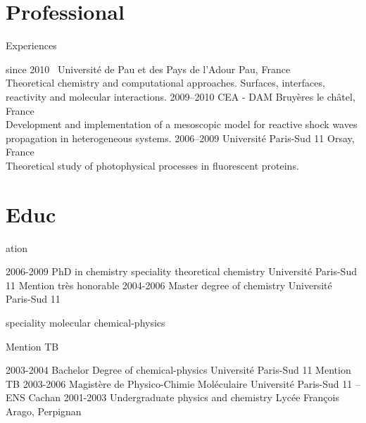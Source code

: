 \documentclass{cv-style}     %
\begin{document}

\section{Professional }{Experiences}
\vspace{-0.2cm}

\begin{entrylist}
\entry
  {since 2010~}
  {Université de Pau et des Pays de l'Adour}
  {Pau, France}
  {\\
   Theoretical chemistry and computational approaches.
   Surfaces, interfaces, reactivity and molecular interactions.}
\entry
  {2009--2010}
  {CEA - DAM}
  {Bruyères le châtel, France}
  {
  \\
  Development and implementation of a mesoscopic model for reactive shock waves
  propagation in heterogeneous systems.
  }
\entry
  {2006--2009}
  {Université Paris-Sud 11}
  {Orsay, France}
  {
  \\
  Theoretical study of photophysical processes in fluorescent proteins.\\
  }
\end{entrylist}

\vspace{-4mm}
\section{Educ}{ation}
\vspace{-0.2cm}

\begin{entrylist}
\entry
{2006-2009}
{PhD in chemistry {\normalfont speciality theoretical chemistry}}
{Université Paris-Sud 11}
{Mention très honorable}
\entry
{2004-2006}
{Master degree of chemistry}
{Université Paris-Sud 11}
{{\normalfont speciality molecular chemical-physics}\par Mention TB}
\entry
{2003-2004}
{Bachelor Degree of chemical-physics}
{Université Paris-Sud 11}
{Mention TB}
\entry
{2003-2006}
{Magistère de Physico-Chimie Moléculaire}
{Université Paris-Sud 11 -- ENS Cachan}
{\vspace{-4mm}}
\entry
{2001-2003}
{Undergraduate {\normalfont physics and chemistry}}
{Lycée François Arago, Perpignan}
{}
\end{entrylist}
\end{document}
